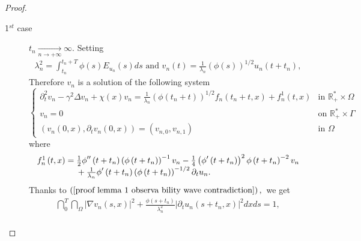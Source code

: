 \documentclass[11pt,reqno]{amsart}
\theoremstyle{plain}
\numberwithin{equation}{section}
\numberwithin{equation}{section}
\begin{document}
\begin{proof}
\begin{description}
\item[1$^{st}$ case] $t_{n}\underset{n\rightarrow +\infty }{\longrightarrow }%
\infty .$ Setting%
\begin{equation*}
\begin{array}{c}
\lambda _{n}^{2}=\int_{t_{n}}^{t_{n}+T}\phi \left( s\right) E_{u_{n}}\left(
s\right) ds\text{ and }v_{n}\left( t\right) =\frac{1}{\lambda _{n}}\left(
\phi \left( s\right) \right) ^{1/2}u_{n}\left( t+t_{n}\right) ,%
\end{array}%
\end{equation*}%
Therefore $v_{n}$ is a solution of the following system 
\begin{equation*}
\left\{ 
\begin{array}{ll}
\partial _{t}^{2}v_{n}-\gamma ^{2}\Delta v_{n}+\chi \left( x\right) v_{n}=%
\frac{1}{\lambda _{n}}\left( \phi \left( t_{n}+t\right) \right)
^{1/2}f_{n}\left( t_{n}+t,x\right) +f_{n}^{1}\left( t,x\right) & \text{in }%
\mathbb{R}_{+}^{\ast }\times \Omega \\ 
v_{n}=0 & \text{on }\mathbb{R}_{+}^{\ast }\times \Gamma \\ 
\left( v_{n}\left( 0,x\right) ,\partial _{t}v_{n}\left( 0,x\right) \right)
=\left( v_{n,0},v_{n,1}\right) & \text{in }\Omega%
\end{array}%
\right.
\end{equation*}%
where%
\begin{equation*}
\begin{array}{l}
f_{n}^{1}\left( t,x\right) =\frac{1}{2}\phi ^{\prime \prime }\left(
t+t_{n}\right) \left( \phi \left( t+t_{n}\right) \right) ^{-1}v_{n}-\frac{1}{%
4}\left( \phi ^{\prime }\left( t+t_{n}\right) \right) ^{2}\phi \left(
t+t_{n}\right) ^{-2}v_{n} \\ 
\text{ \ \ \ \ \ \ \ \ \ \ \ }+\frac{1}{\lambda _{n}}\phi ^{\prime }\left(
t+t_{n}\right) \left( \phi \left( t+t_{n}\right) \right) ^{-1/2}\partial
_{t}u_{n}.%
\end{array}%
\end{equation*}%
Thanks to $\left( \ref{proof lemma 1 observa bility wave contradiction}%
\right) ,$\ we get%
\begin{equation}
\begin{array}{l}
\dint_{0}^{T}\dint_{\Omega }\left\vert \nabla v_{n}\left( s,x\right)
\right\vert ^{2}+\frac{\phi \left( s+t_{n}\right) }{\lambda _{n}^{2}}%
\left\vert \partial _{t}u_{n}\left( s+t_{n},x\right) \right\vert ^{2}dxds=1,
\\ 

\end{array}
\end{equation}
\end{description}
\end{proof}
\end{document}

